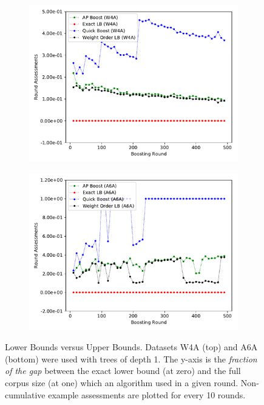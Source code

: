 
\begin{figure}
\centering
\begin{subfigure}{.5\textwidth}
\includegraphics[width=\linewidth]{decisiontree/figures/result4_elb_w4a}
\end{subfigure}
\begin{subfigure}{.5\textwidth}
\includegraphics[width=\linewidth]{decisiontree/figures/result4_elb_a6a}
\end{subfigure}
\caption{Lower Bounds versus Upper Bounds. Datasets W4A (top) and A6A (bottom) were used with trees of depth 1.
The y-axis is the \emph{fraction of the gap}
between the exact lower bound
(at zero) and the full corpus size (at one) which an algorithm used in a
given round.
Non-cumulative example assessments are plotted for every 10 rounds.
}
\label{fig:elb}
\vspace{-2em}
\end{figure}
